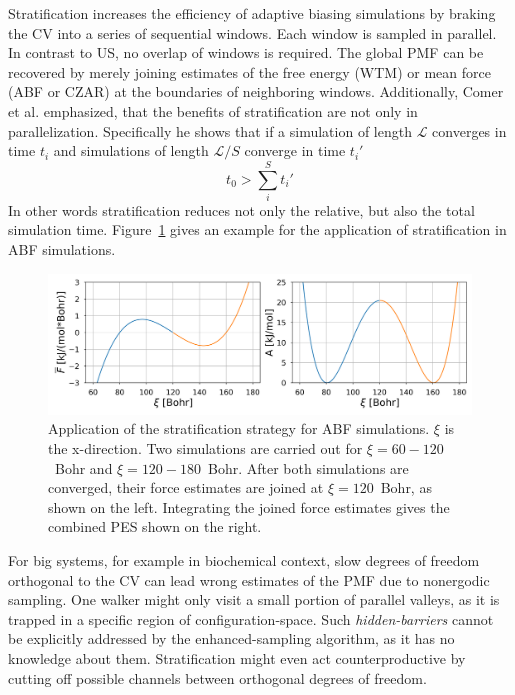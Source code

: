 Stratification increases the efficiency of adaptive biasing simulations by braking the CV into a series of sequential windows.\autocite{valleau1972monte} Each window is sampled in parallel.
In contrast to US, no overlap of windows is required.
The global PMF can be recovered by merely joining estimates of the free energy (WTM) or mean force (ABF or CZAR) at the boundaries of neighboring windows.
Additionally, Comer et al.\autocite{comer2015adaptive} emphasized, that the benefits of stratification are not only in parallelization.
Specifically he shows that if a simulation of length $\mathcal{L}$ converges in time $t_i$ and simulations of length $\mathcal{L}/S$ converge in time $t_i'$
\begin{equation}
  t_0 > \sum^S_i t_i'
\end{equation}
In other words stratification reduces not only the relative, but also the total simulation time. Figure~\ref{fig:stratification} gives an example for the application of stratification in ABF simulations.
\begin{figure}[H]
    \centering
    \includegraphics[width=1\textwidth]{bilder/ABF_stratification}
    \caption{Application of the stratification strategy for ABF simulations. $\xi$ is the x-direction. Two simulations are carried out for $\xi=60-120$~Bohr and $\xi=120-180$~Bohr. After both simulations are converged, their force estimates are joined at $\xi=120$~Bohr, as shown on the left.
    Integrating the joined force estimates gives the combined PES shown on the right.
    }
\label{fig:stratification}%
\end{figure}
For big systems, for example in biochemical context, slow degrees of freedom orthogonal to the CV can lead wrong estimates of the PMF due to nonergodic sampling.\autocite{minoukadeh2010potential}
One walker might only visit a small portion of parallel valleys, as it is trapped in a specific region of configuration-space.
Such \textit{hidden-barriers} cannot be explicitly addressed by the enhanced-sampling algorithm, as it has no knowledge about them.\autocite{fu2019taming}
Stratification might even act counterproductive by cutting off possible channels between orthogonal degrees of freedom.\autocite{comer2015adaptive}
